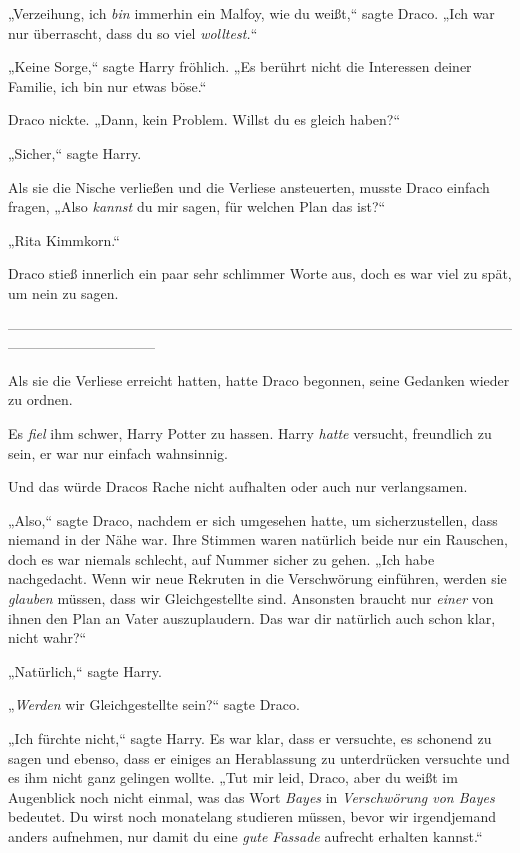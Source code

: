 {„Verzeihung, ich \emph{bin} immerhin ein Malfoy, wie du weißt,“ sagte Draco. „Ich war nur überrascht, dass du so viel \emph{wolltest.}“

„Keine Sorge,“ sagte Harry fröhlich. „Es berührt nicht die Interessen deiner Familie, ich bin nur etwas böse.“

Draco nickte. „Dann, kein Problem. Willst du es gleich haben?“

„Sicher,“ sagte Harry.

Als sie die Nische verließen und die Verliese ansteuerten, musste Draco einfach fragen, „Also \emph{kannst} du mir sagen, für welchen Plan das ist?“

„Rita Kimmkorn.“

Draco stieß innerlich ein paar sehr schlimmer Worte aus, doch es war viel zu spät, um nein zu sagen.

--------------------------------------------------------------------------------------------------------------------------------------------

Als sie die Verliese erreicht hatten, hatte Draco begonnen, seine Gedanken wieder zu ordnen.

Es \emph{fiel} ihm schwer, Harry Potter zu hassen. Harry \emph{hatte} versucht, freundlich zu sein, er war nur einfach wahnsinnig.

Und das würde Dracos Rache nicht aufhalten oder auch nur verlangsamen.

„Also,“ sagte Draco, nachdem er sich umgesehen hatte, um sicherzustellen, dass niemand in der Nähe war. Ihre Stimmen waren natürlich beide nur ein Rauschen, doch es war niemals schlecht, auf Nummer sicher zu gehen. „Ich habe nachgedacht. Wenn wir neue Rekruten in die Verschwörung einführen, werden sie \emph{glauben} müssen, dass wir Gleichgestellte sind. Ansonsten braucht nur \emph{einer} von ihnen den Plan an Vater auszuplaudern. Das war dir natürlich auch schon klar, nicht wahr?“

„Natürlich,“ sagte Harry.

„\emph{Werden} wir Gleichgestellte sein?“ sagte Draco.

„Ich fürchte nicht,“ sagte Harry. Es war klar, dass er versuchte, es schonend zu sagen und ebenso, dass er einiges an Herablassung zu unterdrücken versuchte und es ihm nicht ganz gelingen wollte. „Tut mir leid, Draco, aber du weißt im Augenblick noch nicht einmal, was das Wort \emph{Bayes} in \emph{Verschwörung von Bayes} bedeutet. Du wirst noch monatelang studieren müssen, bevor wir irgendjemand anders aufnehmen, nur damit du eine \emph{gute Fassade} aufrecht erhalten kannst.“

}
